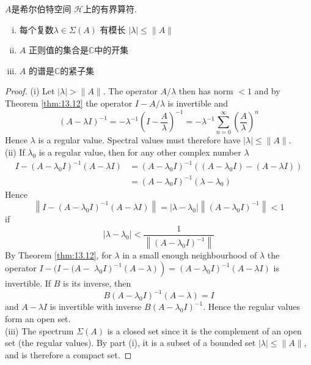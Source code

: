 \begin{theorem}\label{thm:13.17} 
    \(A\)是希尔伯特空间 \(\mathcal{H}\)上的有界算符.
    \begin{enumerate}[(i).]
        \item 每个复数\(\lambda \in \Sigma(A)\) 有模长 \(|\lambda| \leq\|A\|\)
        \item \(A\) 正则值的集合是\(\mathbb{C}\)中的开集
        \item \(A\) 的谱是\(\mathbb{C}\)的紧子集
    \end{enumerate}
\end{theorem}
\begin{proof}
    (i) Let \(|\lambda|>\|A\|\). The operator \(A / \lambda\) then has norm \(<1\) and by Theorem \ref{thm:13.12} the operator \(I-A / \lambda\) is invertible and
    \[
    (A-\lambda I)^{-1}=-\lambda^{-1}\left(I-\frac{A}{\lambda}\right)^{-1}=-\lambda^{-1} \sum_{n=0}^{\infty}\left(\frac{A}{\lambda}\right)^{n}
    \]
    Hence \(\lambda\) is a regular value. Spectral values must therefore have \(|\lambda| \leq\|A\|\).\\
    (ii) If \(\lambda_{0}\) is a regular value, then for any other complex number \(\lambda\)
    \[
    \begin{aligned}
    I-\left(A-\lambda_{0} I\right)^{-1}(A-\lambda I) &=\left(A-\lambda_{0} I\right)^{-1}\left(\left(A-\lambda_{0} I\right)-(A-\lambda I)\right) \\
    &=\left(A-\lambda_{0} I\right)^{-1}\left(\lambda-\lambda_{0}\right)
    \end{aligned}
    \]
    Hence
    \[
    \left\|I-\left(A-\lambda_{0} I\right)^{-1}(A-\lambda I)\right\|=\left|\lambda-\lambda_{0}\right|\left\|\left(A-\lambda_{0} I\right)^{-1}\right\|<1
    \]
    if
    \[
    \left|\lambda-\lambda_{0}\right|<\frac{1}{\left\|\left(A-\lambda_{0} I\right)^{-1}\right\|}
    \]
    By Theorem \ref{thm:13.12}, for \(\lambda\) in a small enough neighbourhood of \(\lambda\) the operator \(I-(I-(A-\) \(\left.\left.\lambda_{0} I\right)^{-1}(A-\lambda)\right)=\left(A-\lambda_{0} I\right)^{-1}(A-\lambda I)\) is invertible. If \(B\) is its inverse, then
    \[
    B\left(A-\lambda_{0} I\right)^{-1}(A-\lambda)=I
    \]
    and \(A-\lambda I\) is invertible with inverse \(B\left(A-\lambda_{0} I\right)^{-1}\). Hence the regular values form an open set.\\
    (iii) The spectrum \(\Sigma(A)\) is a closed set since it is the complement of an open set (the regular values). By part (i), it is a subset of a bounded set \(|\lambda| \leq\|A\|\), and is therefore a compact set.
\end{proof}
